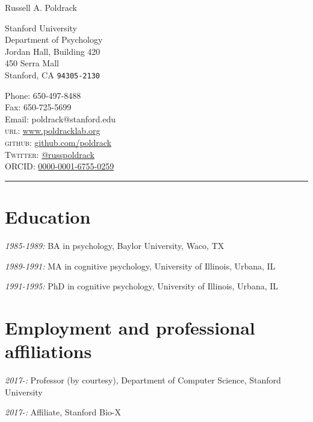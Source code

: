 \documentclass[10pt, letterpaper]{article}
\begin{document}
\reversemarginpar
{\LARGE Russell A. Poldrack}\\[4mm]
\vspace{-1cm}



\begin{multicols}{2}
Stanford University\\
Department of Psychology\\
Jordan Hall, Building 420\\
450 Serra Mall\\
Stanford, CA \texttt{94305-2130}\\  %

\renewcommand\UrlFont{\color{red}\rmfamily\em}

\columnbreak
Phone:  650-497-8488\\
Fax: 650-725-5699\\
Email: poldrack@stanford.edu\\
\textsc{url}: \href{http://www.poldracklab.org}{www.poldracklab.org}\\ 
\textsc{github}: \href{https://github.com/poldrack/}{github.com/poldrack}\\
\textsc{Twitter}: \href{https://twitter.com/russpoldrack}{@russpoldrack}\\
\textsc{ORCID}: \href{https://orcid.org/0000-0001-6755-0259}{0000-0001-6755-0259}
\end{multicols}

\hrule

\section*{Education}
\noindent
\textit{1985-1989:} BA in psychology, Baylor University, Waco, TX

\textit{1989-1991:} MA in cognitive psychology, University of Illinois, Urbana, IL

\textit{1991-1995:} PhD in cognitive psychology, University of Illinois, Urbana, IL

\section*{Employment and professional affiliations}
\noindent

\textit{2017-:} Professor (by courtesy), Department of Computer Science, Stanford University

\textit{2017-:} Affiliate, Stanford Bio-X
\end{document}
